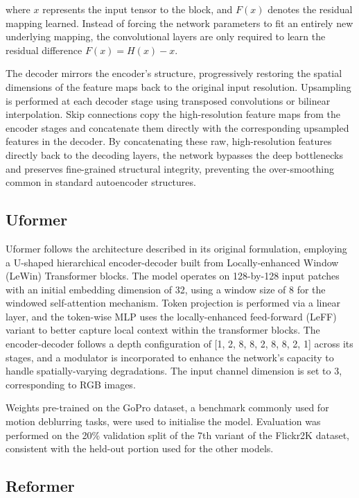 \documentclass[conference]{IEEEtran}
\begin{document}
where $x$ represents the input tensor to the block,
and $F(x)$ denotes the residual mapping learned.
Instead of forcing the network parameters to fit an entirely new underlying mapping,
the convolutional layers are only required to learn the residual difference $F(x) = H(x) - x$.

The decoder mirrors the encoder's structure,
progressively restoring the spatial dimensions of the feature maps back to the original input resolution.
Upsampling is performed at each decoder stage using transposed convolutions or bilinear interpolation.
Skip connections copy the high-resolution feature maps from the encoder stages
and concatenate them directly with the corresponding upsampled features in the decoder.
By concatenating these raw, high-resolution features directly back to the decoding layers,
the network bypasses the deep bottlenecks and preserves fine-grained structural integrity,
preventing the over-smoothing common in standard autoencoder structures.

\subsection{Uformer}

Uformer follows the architecture described in its original formulation,
employing a U-shaped hierarchical encoder-decoder built from Locally-enhanced
Window (LeWin) Transformer blocks. The model operates on 128-by-128 input
patches with an initial embedding dimension of 32, using a window size of 8 for
the windowed self-attention mechanism. Token projection is performed via a
linear layer, and the token-wise MLP uses the locally-enhanced feed-forward
(LeFF) variant to better capture local context within the transformer blocks.
The encoder-decoder follows a depth configuration of [1, 2, 8, 8, 2, 8, 8, 2,
1] across its stages, and a modulator is incorporated to enhance the network's
capacity to handle spatially-varying degradations. The input channel dimension
is set to 3, corresponding to RGB images.

Weights pre-trained on the GoPro dataset, a benchmark commonly used for
motion deblurring tasks, were used to initialise the model. Evaluation was
performed on the 20\% validation split of the 7th variant of the Flickr2K
dataset, consistent with the held-out portion used for the other models.


\subsection{Reformer}
\end{document}
